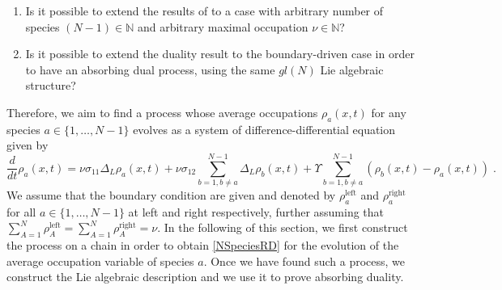 \documentclass[10pt]{article}
\numberwithin{equation}{section}
\numberwithin{equation}{subsection}
\newcommand{\dt}{\;.}
\begin{document}
{\begin{enumerate}
		\item Is it possible to extend the results of \cite{casini2022uphill} to a case with arbitrary number of species $(N-1)\in \mathbb{N}$ and arbitrary maximal occupation $\nu\in \mathbb{N}$?
			\item Is it possible to extend the duality result to the boundary-driven case in order to have an absorbing dual process, using the same ${gl}(N)$ Lie algebraic structure?
\end{enumerate}
Therefore, we aim to find a process whose average occupations $\rho_{a}(x,t)$ for any species $a\in\{1,\ldots,N-1\}$ evolves as a system of difference-differential equation given by 
\begin{equation}\label{NSpeciesRD}
	\frac{d}{dt} \rho_{a}(x,t)=\nu\sigma_{11}\Delta_{L}\rho_{a}(x,t)+\nu\sigma_{12}\sum_{b=1,b\neq a}^{N-1}\Delta_{L}\rho_{b}(x,t)+\Upsilon\sum_{b=1,b\neq a}^{N-1}\left(\rho_{b}(x,t)-\rho_{a}(x,t)\right)\dt
\end{equation} 
 We assume that the boundary condition are given and denoted by $\rho_{a}^{\text{left}}$ and $\rho_{a}^{\text{right}}$ for all $a\in\{1,\ldots,N-1\}$ at left and right respectively, further assuming that $\sum_{A=1}^{N}\rho_{A}^{\text{left}}=\sum_{A=1}^{N}\rho_{A}^{\text{right}}=\nu$. In the following of this section, we first construct the process on a chain in order to obtain \eqref{NSpeciesRD} for the evolution of the average occupation variable of species $a$. Once we have found such a process, we construct the Lie algebraic description and we use it to prove absorbing duality.
}
\end{document}
